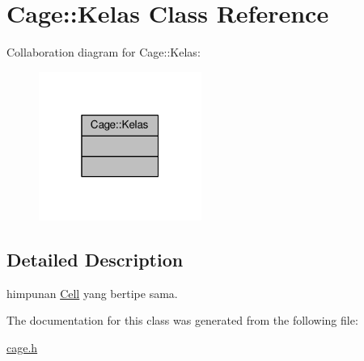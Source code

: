 \hypertarget{classCage_1_1Kelas}{}\section{Cage\+:\+:Kelas Class Reference}
\label{classCage_1_1Kelas}


Collaboration diagram for Cage\+:\+:Kelas\+:
\nopagebreak
\begin{figure}[H]
\begin{center}
\leavevmode
\includegraphics[width=151pt]{classCage_1_1Kelas__coll__graph}
\end{center}
\end{figure}


\subsection{Detailed Description}
himpunan \hyperlink{classCell}{Cell} yang bertipe sama. 

The documentation for this class was generated from the following file\+:\begin{DoxyCompactItemize}
\item 
\hyperlink{cage_8h}{cage.\+h}\end{DoxyCompactItemize}
